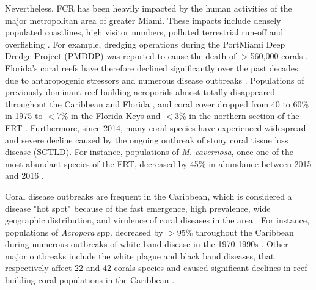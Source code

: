 Nevertheless, FCR has been heavily impacted by the human activities of the major metropolitan area of greater Miami. These impacts include densely populated coastlines, high visitor numbers, polluted terrestrial run-off and overfishing \citep{jackson2014status}. For example, dredging operations during the PortMiami Deep Dredge Project (PMDDP) was reported to cause the death of $>$560,000 corals \citep{cunning2019extensive}. Florida's coral reefs have therefore declined significantly over the past decades due to anthropogenic stressors and numerous disease outbreaks \citep{gardner2003long, jackson2014status}. Populations of previously dominant reef-building acroporids almost totally disappeared throughout the Caribbean and Florida \citep{aronson2001white}, and coral cover dropped from 40 to 60\% in 1975 to $<$7\% in the Florida Keys \citep{jackson2014status} and $<$3\% in the northern section of the FRT \citep{walton2018impacts}. Furthermore, since 2014, many coral species have experienced widespread and severe decline caused by the ongoing outbreak of stony coral tissue loss disease (SCTLD). For instance, populations of \textit{M. cavernosa}, once one of the most abundant species of the FRT, decreased by 45\% in abundance between 2015 and 2016 \citep{walton2018impacts}.


Coral disease outbreaks are frequent in the Caribbean, which is considered a disease "hot spot" because of the fast emergence, high prevalence, wide geographic distribution, and virulence of coral diseases in the area \citep{green2000significance, harvell2007coral}. For instance, populations of  \textit{Acropora} spp. decreased by $>$95\% throughout the Caribbean during numerous outbreaks of white-band disease in the 1970-1990s \citep{aronson2001white}. Other major outbreaks include the white plague and black band diseases, that respectively affect 22 and 42 corals species and caused significant declines in reef-building coral populations in the Caribbean \citep{bruckner2003field,miller2009coral, muller2011black}. 

